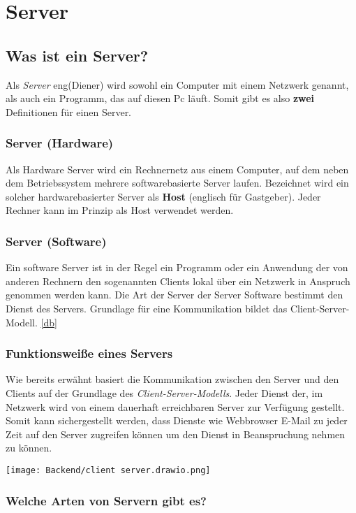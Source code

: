\section{Server}

\subsection{Was ist ein Server?}
Als \textit{Server} eng(Diener) wird sowohl ein Computer mit einem Netzwerk genannt,
als auch ein Programm, das auf diesen Pc läuft. Somit gibt es also \textbf{zwei} Definitionen
für einen Server.

\subsubsection{Server (Hardware)}
Als Hardware Server wird ein Rechnernetz aus einem Computer, auf dem neben dem Betriebssystem
mehrere softwarebasierte Server laufen. Bezeichnet wird ein solcher hardwarebasierter
Server als \textbf{Host} (englisch für Gastgeber). Jeder Rechner kann im Prinzip als Host verwendet
werden.

\subsubsection{Server (Software)}
Ein software Server ist in der Regel ein Programm oder ein Anwendung
der von anderen Rechnern den sogenannten Clients lokal über ein Netzwerk in Anspruch genommen
werden kann. Die Art der Server der Server Software bestimmt den Dienst des Servers. Grundlage für
eine Kommunikation bildet das Client-Server-Modell. \ref{db}

\subsubsection{Funktionsweiße eines Servers}
Wie bereits erwähnt basiert die Kommunikation zwischen den Server und den Clients
auf der Grundlage des \textit{Client-Server-Modells}. Jeder Dienst der, im Netzwerk wird von
einem dauerhaft erreichbaren Server zur Verfügung gestellt. Somit kann sichergestellt werden, dass
Dienste wie Webbrowser E-Mail zu jeder Zeit auf den Server zugreifen können um den Dienst
in Beanspruchung nehmen zu können.

\texttt{[image: Backend/client server.drawio.png]}
\subsubsection{Welche Arten von Servern gibt es?}

\cite{Server}

\label{server}